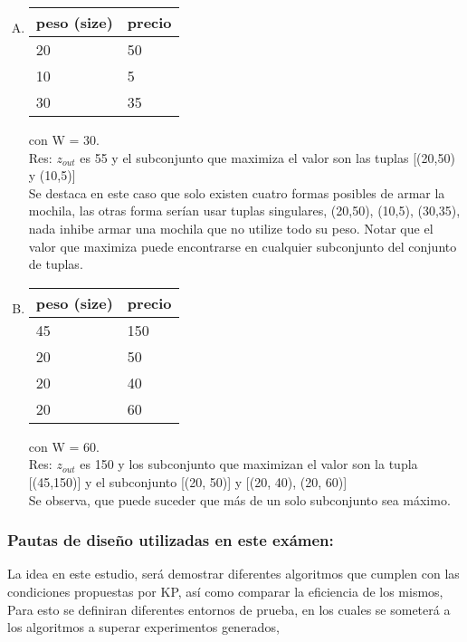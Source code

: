 \documentclass[fleqn, 11pt]{article}
\begin{document}
\begin{enumerate}[A.]

\item
\begin{tabular}{l l}
	peso (size) & precio \\ \toprule
    20 & 50 \\
    10 & 5  \\
    30 & 35  \\
\end{tabular}
con W = 30. \\

Res: $z_{out}$ es 55 y el subconjunto que maximiza el valor son las tuplas [(20,50) y (10,5)] \\

Se destaca en este caso que solo existen cuatro formas posibles de armar la mochila,
las otras forma serían usar tuplas singulares, (20,50), (10,5), (30,35), nada inhibe armar una mochila que no utilize todo su peso. Notar que el valor que maximiza puede encontrarse en cualquier subconjunto del conjunto de tuplas.



\item
\begin{tabular}{l l}
	peso (size) & precio \\ \toprule
    45 & 150 \\
    20 & 50 \\
    20  & 40 \\
    20 & 60


\end{tabular}
con W = 60. \\

Res: $z_{out}$ es 150 y los subconjunto que maximizan el valor son la tupla [(45,150)] y el subconjunto
[(20, 50)] y [(20, 40), (20, 60)] \\

Se observa, que puede suceder que más de un solo subconjunto sea máximo.

\end{enumerate}

\subsubsection{Pautas de diseño utilizadas en este exámen:}

La idea en este estudio, será demostrar diferentes algoritmos que cumplen con las condiciones propuestas por KP, así como comparar la eficiencia de los mismos, Para esto se definiran diferentes entornos de prueba, en los cuales se someterá a los algoritmos a superar experimentos generados, \\
\end{document}
